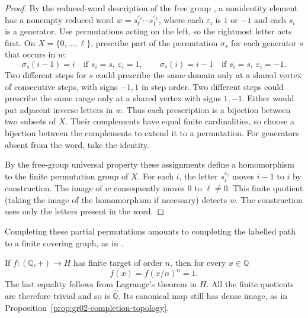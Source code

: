 \begin{proof}
By the reduced-word description of the free group
\cite[Result A01]{geomgroup}, a nonidentity element has a nonempty
reduced word \(w=s_{\ell}^{\varepsilon_{\ell}}\cdots
s_1^{\varepsilon_1}\), where each \(\varepsilon_i\) is \(1\) or
\(-1\) and each \(s_i\) is a generator. Use permutations acting
on the left, so the rightmost letter acts first. On
\(X=\{0,\ldots,\ell\}\), prescribe part of the permutation
\(\sigma_s\) for each generator \(s\) that occurs in \(w\):
\[
   \sigma_s(i-1)=i\quad\text{if }s_i=s,\ \varepsilon_i=1,\qquad
   \sigma_s(i)=i-1\quad\text{if }s_i=s,\ \varepsilon_i=-1.
\]
Two different steps for \(s\) could prescribe the same domain
only at a shared vertex of consecutive steps, with signs
\(-1,1\) in step order. Two different steps could prescribe the
same range only at a shared vertex with signs \(1,-1\).
Either would put adjacent inverse letters in \(w\).
Thus each prescription is a bijection between two subsets of \(X\).
Their complements have equal finite cardinalities, so choose a
bijection between the complements to extend it to a permutation.
For generators absent from the word, take the identity.

By the free-group universal property these assignments define a
homomorphism to the finite permutation group of \(X\).
For each \(i\), the letter \(s_i^{\varepsilon_i}\) moves
\(i-1\) to \(i\) by construction. The image of \(w\) consequently
moves \(0\) to \(\ell\ne 0\). This finite quotient (taking the
image of the homomorphism if necessary) detects \(w\).
The construction uses only the letters present in the word.
\end{proof}

Completing these partial permutations amounts to completing the
labelled path to a finite covering graph, as in
\cite[Theorem 3.2.1, first proof]{profinite-source}.

\begin{example}
\label{ex:gr02-rationals-completion}
If \(f\colon(\mathbb Q,+)\to H\) has finite target of order \(n\),
then for every \(x\in\mathbb Q\)
\[
   f(x)=f(x/n)^n=1.
\]
The last equality follows from Lagrange's theorem in \(H\).
All the finite quotients are therefore trivial and so is
\(\widehat{\mathbb Q}\). Its canonical map still has dense image,
as in Proposition~\ref{prop:gr02-completion-topology}.
\end{example}
